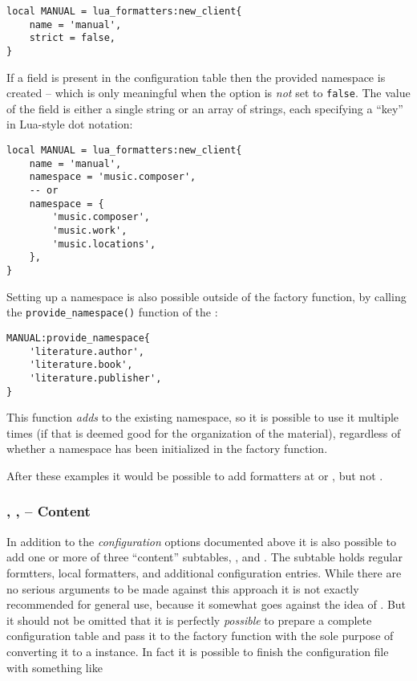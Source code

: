 \documentclass[12pt]{scrartcl}
\begin{document}
\begin{verbatim}
local MANUAL = lua_formatters:new_client{
	name = 'manual',
	strict = false,
}
\end{verbatim}

\noindent If a  field is present in the configuration table
then the provided namespace is created -- which is only meaningful when the
 option is \emph{not} set to \texttt{false}.  The value of the
field is either a single string or an array of strings, each specifying a “key”
in Lua-style dot notation:

\begin{verbatim}
local MANUAL = lua_formatters:new_client{
	name = 'manual',
	namespace = 'music.composer',
	-- or
	namespace = {
		'music.composer',
		'music.work',
		'music.locations',
	},
}
\end{verbatim}

\noindent Setting up a namespace is also possible outside of the factory function, by calling the \texttt{provide_namespace()} function of the :

\begin{verbatim}
MANUAL:provide_namespace{
	'literature.author',
	'literature.book',
	'literature.publisher',
}
\end{verbatim}

\noindent This function \emph{adds} to the existing namespace, so it is possible
to use it multiple times (if that is deemed good for the organization of the
material), regardless of whether a namespace has been initialized in the factory
function.

After these examples it would be possible to add formatters at
 or , but not
.

\subsubsection[Content]{, ,  -- Content}

In addition to the \emph{configuration} options documented above it is also
possible to add one or more of three “content” subtables, ,
 and .  The  subtable
holds regular formtters,  local formatters, and
 additional configuration entries. While there are no
serious arguments to be made against this approach it is not exactly recommended
for general use, because it somewhat goes against the idea of \luaformatters.
But it should not be omitted that it is perfectly \emph{possible} to prepare a
complete configuration table and pass it to the factory function with the sole
purpose of converting it to a  instance. In fact it is
possible to finish the configuration file with something like
\end{document}
